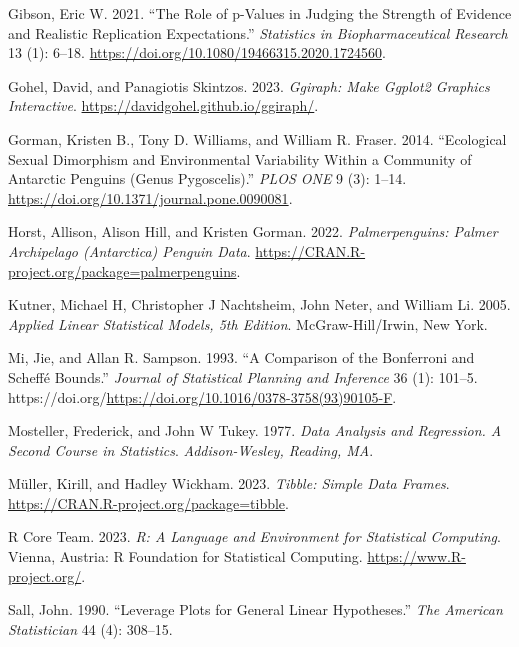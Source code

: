 \documentclass[
]{book}
\newlength{\cslhangindent}
\newlength{\cslentryspacingunit} %
\newenvironment{CSLReferences}[2] %
 {%
  \setlength{\parindent}{0pt}
  \ifodd #1
  \let\oldpar\par
  \def\par{\hangindent=\cslhangindent\oldpar}
  \fi
  \setlength{\parskip}{#2\cslentryspacingunit}
 }%
 {}
\theoremstyle{definition}
\theoremstyle{definition}
\theoremstyle{definition}
\theoremstyle{definition}
\theoremstyle{remark}
\begin{document}
\begin{CSLReferences}{1}{0}
\leavevmode{}%
Gibson, Eric W. 2021. {``The Role of p-Values in Judging the Strength of Evidence and Realistic Replication Expectations.''} \emph{Statistics in Biopharmaceutical Research} 13 (1): 6--18. \url{https://doi.org/10.1080/19466315.2020.1724560}.

\leavevmode{}%
Gohel, David, and Panagiotis Skintzos. 2023. \emph{Ggiraph: Make Ggplot2 Graphics Interactive}. \url{https://davidgohel.github.io/ggiraph/}.

\leavevmode{}%
Gorman, Kristen B., Tony D. Williams, and William R. Fraser. 2014. {``Ecological Sexual Dimorphism and Environmental Variability Within a Community of Antarctic Penguins (Genus Pygoscelis).''} \emph{PLOS ONE} 9 (3): 1--14. \url{https://doi.org/10.1371/journal.pone.0090081}.

\leavevmode{}%
Horst, Allison, Alison Hill, and Kristen Gorman. 2022. \emph{Palmerpenguins: Palmer Archipelago (Antarctica) Penguin Data}. \url{https://CRAN.R-project.org/package=palmerpenguins}.

\leavevmode{}%
Kutner, Michael H, Christopher J Nachtsheim, John Neter, and William Li. 2005. \emph{Applied Linear Statistical Models, 5th Edition}. McGraw-Hill/Irwin, New York.

\leavevmode{}%
Mi, Jie, and Allan R. Sampson. 1993. {``A Comparison of the Bonferroni and Scheffé Bounds.''} \emph{Journal of Statistical Planning and Inference} 36 (1): 101--5. https://doi.org/\url{https://doi.org/10.1016/0378-3758(93)90105-F}.

\leavevmode{}%
Mosteller, Frederick, and John W Tukey. 1977. \emph{Data Analysis and Regression. A Second Course in Statistics}. \emph{Addison-Wesley, Reading, MA}.

\leavevmode{}%
Müller, Kirill, and Hadley Wickham. 2023. \emph{Tibble: Simple Data Frames}. \url{https://CRAN.R-project.org/package=tibble}.

\leavevmode{}%
R Core Team. 2023. \emph{R: A Language and Environment for Statistical Computing}. Vienna, Austria: R Foundation for Statistical Computing. \url{https://www.R-project.org/}.

\leavevmode{}%
Sall, John. 1990. {``Leverage Plots for General Linear Hypotheses.''} \emph{The American Statistician} 44 (4): 308--15.


\end{CSLReferences}
\end{document}
